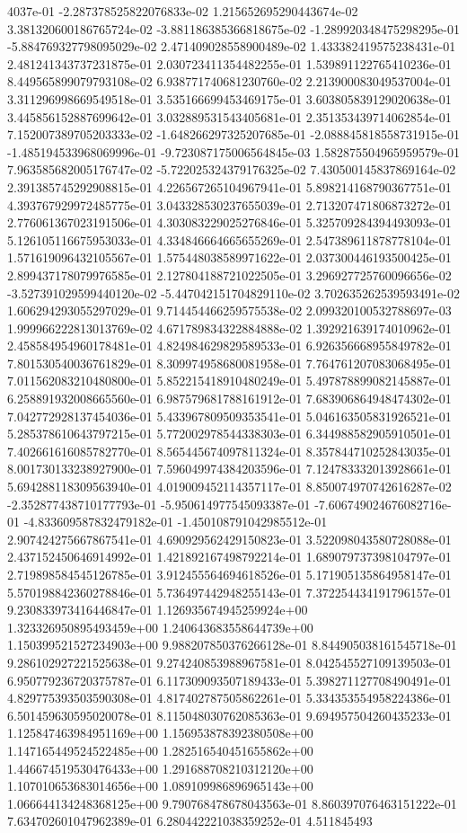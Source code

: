 4037e-01	-2.287378525822076833e-02	1.215652695290443674e-02	3.381320600186765724e-02	-3.881186385366818675e-02	-1.289920348475298295e-01	-5.884769327798095029e-02	2.471409028558900489e-02	1.433382419575238431e-01	2.481241343737231875e-01	2.030723411354482255e-01	1.539891122765410236e-01	8.449565899079793108e-02	6.938771740681230760e-02	2.213900083049537004e-01	3.311296998669549518e-01	3.535166699453469175e-01	3.603805839129020638e-01	3.445856152887699642e-01	3.032889531543405681e-01	2.351353439714062854e-01	7.152007389705203333e-02	-1.648266297325207685e-01	-2.088845818558731915e-01	-1.485194533968069996e-01	-9.723087175006564845e-03	1.582875504965959579e-01	7.963585682005176747e-02	-5.722025324379176325e-02	7.430500145837869164e-02	2.391385745292908815e-01	4.226567265104967941e-01	5.898214168790367751e-01	4.393767929972485775e-01	3.043328530237655039e-01	2.713207471806873272e-01	2.776061367023191506e-01	4.303083229025276846e-01	5.325709284394493093e-01	5.126105116675953033e-01	4.334846664665655269e-01	2.547389611878778104e-01	1.571619096432105567e-01	1.575448038589971622e-01	2.037300446193500425e-01	2.899437178079976585e-01	2.127804188721022505e-01	3.296927725760096656e-02	-3.527391029599440120e-02	-5.447042151704829110e-02	3.702635262539593491e-02	1.606294293055297029e-01	9.714454466259575538e-02	2.099320100532788697e-03	1.999966222813013769e-02	4.671789834322884888e-02	1.392921639174010962e-01	2.458584954960178481e-01	4.824984629829589533e-01	6.926356668955849782e-01	7.801530540036761829e-01	8.309974958680081958e-01	7.764761207083068495e-01	7.011562083210480800e-01	5.852215418910480249e-01	5.497878899082145887e-01	6.258891932008665560e-01	6.987579681788161912e-01	7.683906864948474302e-01	7.042772928137454036e-01	5.433967809509353541e-01	5.046163505831926521e-01	5.285378610643797215e-01	5.772002978544338303e-01	6.344988582905910501e-01	7.402661616085782770e-01	8.565445674097811324e-01	8.357844710252843035e-01	8.001730133238927900e-01	7.596049974384203596e-01	7.124783332013928661e-01	5.694288118309563940e-01	4.019009452114357117e-01	8.850074970742616287e-02	-2.352877438710177793e-01	-5.950614977545093387e-01	-7.606749024676082716e-01	-4.833609587832479182e-01	-1.450108791042985512e-01	2.907424275667867541e-01	4.690929562429150823e-01	3.522098043580728088e-01	2.437152450646914992e-01	1.421892167498792214e-01	1.689079737398104797e-01	2.719898584545126785e-01	3.912455564694618526e-01	5.171905135864958147e-01	5.570198842360278846e-01	5.736497442948255143e-01	7.372254434191796157e-01	9.230833973416446847e-01	1.126935674945259924e+00	1.323326950895493459e+00	1.240643683558644739e+00	1.150399521527234903e+00	9.988207850376266128e-01	8.844905038161545718e-01	9.286102927221525638e-01	9.274240853988967581e-01	8.042545527109139503e-01	6.950779236720375787e-01	6.117309093507189433e-01	5.398271127708490491e-01	4.829775393503590308e-01	4.817402787505862261e-01	5.334353554958224386e-01	6.501459630595020078e-01	8.115048030762085363e-01	9.694957504260435233e-01	1.125847463984951169e+00	1.156953878392380508e+00	1.147165449524522485e+00	1.282516540451655862e+00	1.446674519530476433e+00	1.291688708210312120e+00	1.107010653683014656e+00	1.089109986896965143e+00	1.066644134248368125e+00	9.790768478678043563e-01	8.860397076463151222e-01	7.634702601047962389e-01	6.280442221038359252e-01	4.511845493